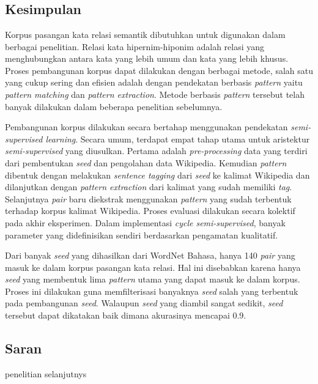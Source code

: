 \chapter{\babEnam}

\section{Kesimpulan}
Korpus pasangan kata relasi semantik dibutuhkan untuk digunakan dalam berbagai penelitian. Relasi kata hipernim-hiponim adalah relasi yang menghubungkan antara kata yang lebih umum dan kata yang lebih khusus. Proses pembangunan korpus dapat dilakukan dengan berbagai metode, salah satu yang cukup sering dan efisien adalah dengan pendekatan berbasis \textit{pattern} yaitu \textit{pattern matching} dan \textit{pattern extraction}. Metode berbasis \textit{pattern} tersebut telah banyak dilakukan dalam beberapa penelitian sebelumnya. 

Pembangunan korpus dilakukan secara bertahap menggunakan pendekatan \textit{semi-supervised learning}. Secara umum, terdapat empat tahap utama untuk aristektur \textit{semi-supervised} yang diusulkan. Pertama adalah \textit{pre-processing} data yang terdiri dari pembentukan \textit{seed} dan pengolahan data Wikipedia. Kemudian \textit{pattern} dibentuk dengan melakukan \textit{sentence tagging} dari \textit{seed} ke kalimat Wikipedia dan dilanjutkan dengan \textit{pattern extraction} dari kalimat yang sudah memiliki \textit{tag}. Selanjutnya \textit{pair} baru diekstrak menggunakan \textit{pattern} yang sudah terbentuk terhadap korpus kalimat Wikipedia. Proses evaluasi dilakukan secara kolektif pada akhir eksperimen. Dalam implementasi \textit{cycle semi-supervised}, banyak parameter yang didefinisikan sendiri berdasarkan pengamatan kualitatif.

Dari banyak \textit{seed} yang dihasilkan dari WordNet Bahasa, hanya 140 \textit{pair} yang masuk ke dalam korpus pasangan kata relasi. Hal ini disebabkan karena hanya \textit{seed} yang membentuk lima \textit{pattern} utama yang dapat masuk ke dalam korpus. Proses ini dilakukan guna memfilterisasi banyaknya \textit{seed} salah yang terbentuk pada pembangunan \textit{seed}. Walaupun \textit{seed} yang diambil sangat sedikit, \textit{seed} tersebut dapat dikatakan baik dimana akurasinya mencapai 0.9. 



\section{Saran}
penelitian selanjutnys
